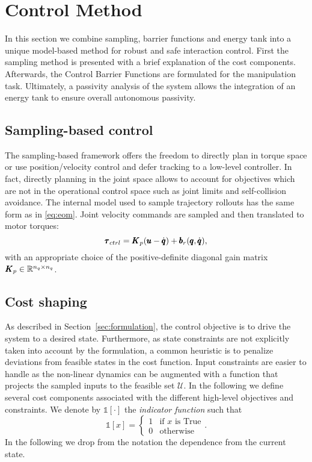 \section{Control Method} \label{sec:control_method}

In this section we combine sampling, barrier functions and energy tank into a unique model-based method for robust and safe interaction control. First the sampling method is presented with a brief explanation of the cost components. Afterwards, the Control Barrier Functions are formulated for the manipulation task. Ultimately, a passivity analysis of the system allows the integration of an energy tank to ensure overall autonomous passivity. 

\subsection{Sampling-based control}
The sampling-based framework offers the freedom to directly plan in torque space or use position/velocity control and defer tracking to a low-level controller. In fact, directly planning in the joint space allows to account for objectives which are not in the operational control space such as joint limits and self-collision avoidance. The internal model used to sample trajectory rollouts has the same form as in \eqn \ref{eq:eom}. Joint velocity commands are sampled and then translated to motor torques:
\begin{equation}
    \pmb{\tau}_{ctrl} = \pmb{K}_{p} (\pmb{u} - \dot{\pmb{q}}) + \pmb{b}_{r}(\pmb{q}, \dot{\pmb{q}}),
\end{equation}
with an appropriate choice of the positive-definite diagonal gain matrix $\pmb{K}_{p} \in \mathbb{R}^{n_q\times n_q}$. 

\subsection{Cost shaping}
As described in Section~\ref{sec:formulation}, the control objective is to drive the system to a desired state. Furthermore, as state constraints are not explicitly taken into account by the formulation, a common heuristic is to penalize deviations from feasible states in the cost function. Input constraints are easier to handle as the non-linear dynamics can be augmented with a function that projects the sampled inputs to the feasible set $\mathcal{U}$. In the following we define several cost components associated with the different high-level objectives and constraints.
We denote by $\mathds{1}[\cdot]$ the \textit{indicator function} such that
\begin{equation}
    \mathds{1}[x] = 
    \begin{cases}
    1 & \text{if } x \text{ is True} \\
    0 & \text{otherwise}
    \end{cases}.
\end{equation}
In the following we drop from the notation the dependence from the current state. 

